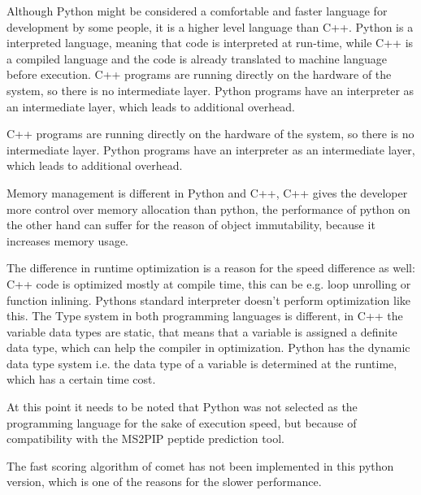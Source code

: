 \documentclass[11pt]{article}
\begin{document}
Although Python might be considered a comfortable and faster language for development by some people, it is a higher level language than C++. Python is a interpreted language, meaning that code is interpreted at run-time, while C++ is a compiled language and the code is already translated to machine language before execution. C++ programs are running directly on the hardware of the system, so there is no intermediate layer. Python programs have an interpreter as an intermediate layer, which leads to additional overhead.

C++ programs are running directly on the hardware of the system, so there is no intermediate layer. Python programs have an interpreter as an intermediate layer, which leads to additional overhead.

Memory management is different in Python and C++, C++ gives the developer more control over memory allocation than python, the performance of python on the other hand can suffer for the reason of object immutability, because it increases memory usage. 

The difference in runtime optimization is a reason for the speed difference as well: C++ code is optimized mostly at compile time, this can be e.g. loop unrolling or function inlining. Pythons standard interpreter doesn't perform optimization like this. The Type system in both programming languages is different, in C++ the variable data types are static, that means that a variable is assigned a definite data type, which can help the compiler in optimization. Python has the dynamic data type system i.e. the data type of a variable is determined at the runtime, which has a certain time cost.

At this point it needs to be noted that Python was not selected as the programming language for the sake of execution speed, but because of compatibility with the MS2PIP peptide prediction tool.

The fast scoring algorithm of comet has not been implemented in this python version, which is one of the reasons for the slower performance.
\end{document}
